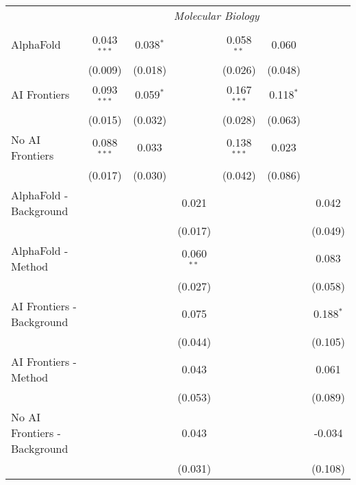 \begin{tabular}{lcccccc}
 & \multicolumn{6}{c}{\textit{Molecular Biology}} \\ \\
   AlphaFold                    & 0.043$^{***}$ & 0.038$^{*}$ &              & 0.058$^{**}$  & 0.060       &   \\   
                                & (0.009)       & (0.018)     &              & (0.026)       & (0.048)     &   \\   
   AI Frontiers                 & 0.093$^{***}$ & 0.059$^{*}$ &              & 0.167$^{***}$ & 0.118$^{*}$ &   \\   
                                & (0.015)       & (0.032)     &              & (0.028)       & (0.063)     &   \\   
   No AI Frontiers              & 0.088$^{***}$ & 0.033       &              & 0.138$^{***}$ & 0.023       &   \\   
                                & (0.017)       & (0.030)     &              & (0.042)       & (0.086)     &   \\   
   AlphaFold - Background       &               &             & 0.021        &               &             & 0.042\\   
                                &               &             & (0.017)      &               &             & (0.049)\\   
   AlphaFold - Method           &               &             & 0.060$^{**}$ &               &             & 0.083\\   
                                &               &             & (0.027)      &               &             & (0.058)\\   
   AI Frontiers - Background    &               &             & 0.075        &               &             & 0.188$^{*}$\\   
                                &               &             & (0.044)      &               &             & (0.105)\\   
   AI Frontiers - Method        &               &             & 0.043        &               &             & 0.061\\   
                                &               &             & (0.053)      &               &             & (0.089)\\   
   No AI Frontiers - Background &               &             & 0.043        &               &             & -0.034\\   
                                &               &             & (0.031)      &               &             & (0.108)\\   

\end{tabular}
